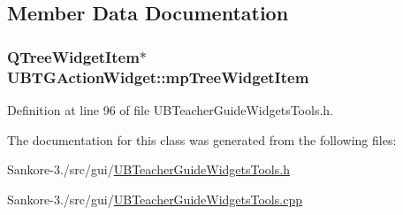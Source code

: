 \subsection{Member Data Documentation}
\hypertarget{class_u_b_t_g_action_widget_a086b9638e6e8ef218e96b33bc6a1ebc2}{
\subsubsection[{mp\-Tree\-Widget\-Item}]{\setlength{\rightskip}{0pt plus 5cm}Q\-Tree\-Widget\-Item$\ast$ U\-B\-T\-G\-Action\-Widget\-::mp\-Tree\-Widget\-Item\hspace{0.3cm}{\ttfamily [protected]}}}\label{da/d7c/class_u_b_t_g_action_widget_a086b9638e6e8ef218e96b33bc6a1ebc2}


Definition at line 96 of file U\-B\-Teacher\-Guide\-Widgets\-Tools.\-h.



The documentation for this class was generated from the following files\-:\begin{DoxyCompactItemize}
\item 
Sankore-\/3./src/gui/\hyperlink{_u_b_teacher_guide_widgets_tools_8h}{U\-B\-Teacher\-Guide\-Widgets\-Tools.\-h}\item 
Sankore-\/3./src/gui/\hyperlink{_u_b_teacher_guide_widgets_tools_8cpp}{U\-B\-Teacher\-Guide\-Widgets\-Tools.\-cpp}\end{DoxyCompactItemize}
